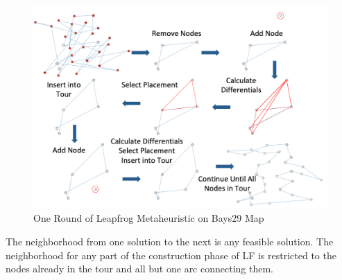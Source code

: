 \documentclass[12pt,letterpaper,oneside]{book}
\begin{document}
	\begin{figure}[H]
		\centering
		\includegraphics[width=.9\linewidth]{example.png}
		\caption{One Round of Leapfrog Metaheuristic on Bays29 Map}
		\label{example}
	\end{figure}
	The neighborhood from one solution to the next is any feasible solution. The neighborhood for any part of the construction phase of LF is restricted to the nodes already in the tour and all but one arc connecting them.
\end{document}
